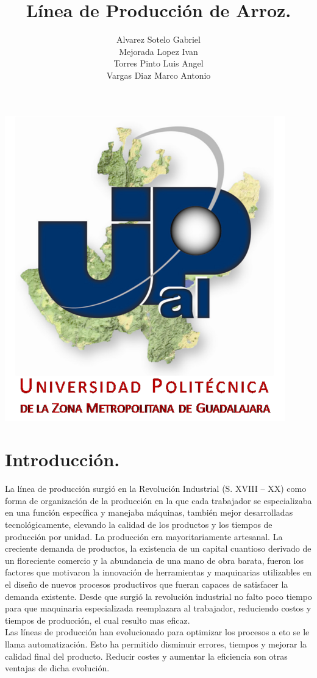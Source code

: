 \documentclass[10pt,a4paper]{article}
\title{Línea de Producción de Arroz.}
\author{Alvarez Sotelo Gabriel\\Mejorada Lopez Ivan\\Torres Pinto Luis Angel\\Vargas Diaz Marco Antonio}
\begin{document}
\maketitle
\centering
\includegraphics[scale=1.90]{upzmg.jpg}\\ 
\raggedright
\newpage
\section{Introducción.}
La línea de producción surgió en la Revolución Industrial (S. XVIII – XX) como forma de organización de la producción en la que cada trabajador se especializaba en una función específica y manejaba máquinas, también mejor desarrolladas tecnológicamente, elevando la calidad de los productos y los tiempos de producción por unidad. La producción era mayoritariamente artesanal. La creciente demanda de productos, la existencia de un capital cuantioso derivado de un floreciente comercio y la abundancia de una mano de obra barata, fueron los factores que motivaron la innovación de herramientas y maquinarias utilizables en el diseño de nuevos procesos productivos que fueran capaces de satisfacer la demanda existente. 
Desde que surgió la revolución industrial no falto poco tiempo para que maquinaria especializada reemplazara al trabajador, reduciendo costos y tiempos de producción, el cual resulto mas eficaz.\\ 
Las líneas de producción han evolucionado para optimizar los procesos a eto se le llama automatización. Esto ha permitido disminuir errores, tiempos y mejorar la calidad final del producto. Reducir costes y aumentar la eficiencia son otras ventajas de dicha evolución. 
\\
\end{document}
